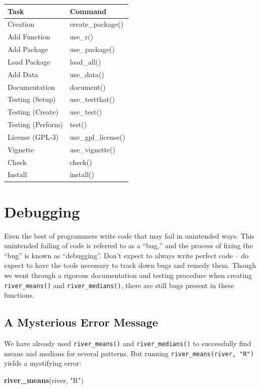 \documentclass[
]{book}
\newenvironment{Shaded}{\begin{snugshade}}{\end{snugshade}}
\newcommand{\KeywordTok}[1]{\textcolor[rgb]{0.13,0.29,0.53}{\textbf{#1}}}
\newcommand{\NormalTok}[1]{#1}
\newcommand{\StringTok}[1]{\textcolor[rgb]{0.31,0.60,0.02}{#1}}
\begin{document}
\begin{tabular}{l|l}
\hline
Task & Command\\
\hline
Creation & create\_package()\\
\hline
Add Function & use\_r()\\
\hline
Add Package & use\_package()\\
\hline
Load Package & load\_all()\\
\hline
Add Data & use\_data()\\
\hline
Documentation & document()\\
\hline
Testing (Setup) & use\_testthat()\\
\hline
Testing (Create) & use\_test()\\
\hline
Testing (Perform) & test()\\
\hline
License (GPL-3) & use\_gpl\_license()\\
\hline
Vignette & use\_vignette()\\
\hline
Check & check()\\
\hline
Install & install()\\
\hline
\end{tabular}

\hypertarget{debugging}{%
\section{Debugging}\label{debugging}}

Even the best of programmers write code that may fail in unintended ways. This unintended failing of code is referred to as a ``bug,'' and the process of fixing the ``bug'' is known as ``debugging''. Don't expect to always write perfect code -- do expect to have the tools necessary to track down bugs and remedy them. Though we went through a rigorous documentation and testing procedure when creating \texttt{river\_means()} and \texttt{river\_medians()}, there are still bugs present in these functions.

\hypertarget{error-onematch}{%
\subsection{A Mysterious Error Message}\label{error-onematch}}

We have already used \texttt{river\_means()} and \texttt{river\_medians()} to successfully find means and medians for several patterns. But running \texttt{river\_means(river,\ "R")} yields a mystifying error:

\begin{Shaded}
\begin{Highlighting}[]
\KeywordTok{river_means}\NormalTok{(river, }\StringTok{"R"}\NormalTok{)}
\end{Highlighting}
\end{Shaded}
\end{document}
